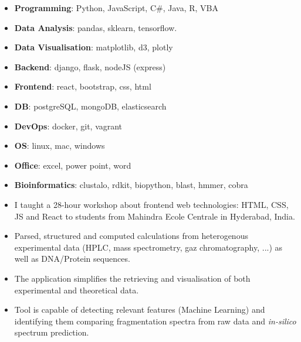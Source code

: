 
\begin{itemize}
  \item \textbf{Programming}: Python, JavaScript, C\#, Java, R, VBA
  \item \textbf{Data Analysis}: pandas, sklearn, tensorflow.
  \item \textbf{Data Visualisation}: matplotlib, d3, plotly
  \item \textbf{Backend}: django, flask, nodeJS (express)
  \item \textbf{Frontend}: react, bootstrap, css, html
  \item \textbf{DB}: postgreSQL, mongoDB, elasticsearch
  \item \textbf{DevOps}: docker, git, vagrant
  \item \textbf{OS}: linux, mac, windows
  \item \textbf{Office}: excel, power point, word
  \item \textbf{Bioinformatics}: clustalo, rdkit, biopython, blast, hmmer, cobra
\end{itemize}





\begin{itemize}
  \item I taught a 28-hour workshop about frontend web technologies: HTML, CSS, JS and React to students from Mahindra Ecole Centrale in Hyderabad, India.
\end{itemize}

\begin{itemize}
	\item Parsed, structured and computed calculations from heterogenous experimental data (HPLC, mass spectrometry, gaz chromatography, ...) as well as DNA/Protein sequences.
\end{itemize}
\smallskip

\begin{itemize}
	\item The application simplifies the retrieving and visualisation of both experimental and theoretical data.
\end{itemize}
\smallskip

\begin{itemize}
	\item Tool is capable of detecting relevant features (Machine Learning) and identifying them comparing fragmentation spectra from raw data and \textit{in-silico} spectrum prediction.
\end{itemize}
\smallskip

